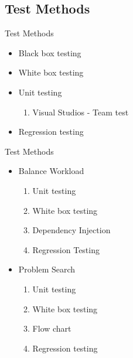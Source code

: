 \subsection{Test Methods}
\begin{frame}{Test Methods}
	\begin{itemize}
		\item Black box testing
		\item White box testing
		\item Unit testing
		\begin{enumerate}
				\item Visual Studios - Team test
		\end{enumerate}
		\item Regression testing
	\end{itemize}
\end{frame}

\begin{frame}{Test Methods}
	\begin{itemize}
		\item Balance Workload
			\begin{enumerate}
				\item Unit testing
				\item White box testing
				\item Dependency Injection
				\item Regression Testing
			\end{enumerate}
		\item Problem Search
		\begin{enumerate}
				\item Unit testing
				\item White box testing
			\item Flow chart
			\item Regression testing
		\end{enumerate}
	\end{itemize}
\end{frame}